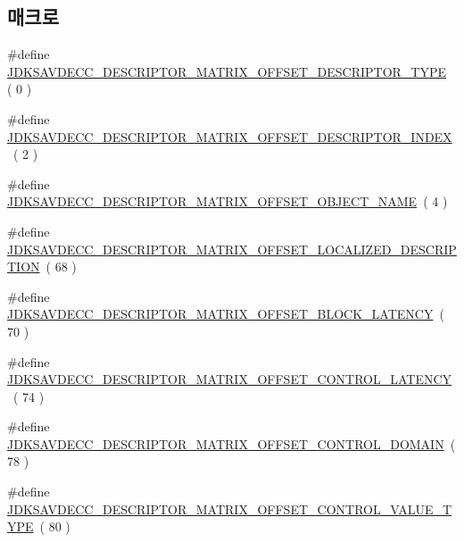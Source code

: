 \subsection*{매크로}
\begin{DoxyCompactItemize}
\item 
\#define \hyperlink{group__descriptor__matrix_gac508a3e60a3848d70e10eb9d85f8b153}{J\+D\+K\+S\+A\+V\+D\+E\+C\+C\+\_\+\+D\+E\+S\+C\+R\+I\+P\+T\+O\+R\+\_\+\+M\+A\+T\+R\+I\+X\+\_\+\+O\+F\+F\+S\+E\+T\+\_\+\+D\+E\+S\+C\+R\+I\+P\+T\+O\+R\+\_\+\+T\+Y\+PE}~( 0 )
\item 
\#define \hyperlink{group__descriptor__matrix_ga2a9d7345e6db186a6bce18c8feb19964}{J\+D\+K\+S\+A\+V\+D\+E\+C\+C\+\_\+\+D\+E\+S\+C\+R\+I\+P\+T\+O\+R\+\_\+\+M\+A\+T\+R\+I\+X\+\_\+\+O\+F\+F\+S\+E\+T\+\_\+\+D\+E\+S\+C\+R\+I\+P\+T\+O\+R\+\_\+\+I\+N\+D\+EX}~( 2 )
\item 
\#define \hyperlink{group__descriptor__matrix_ga47badb9357fe1c60839270d56246e7d7}{J\+D\+K\+S\+A\+V\+D\+E\+C\+C\+\_\+\+D\+E\+S\+C\+R\+I\+P\+T\+O\+R\+\_\+\+M\+A\+T\+R\+I\+X\+\_\+\+O\+F\+F\+S\+E\+T\+\_\+\+O\+B\+J\+E\+C\+T\+\_\+\+N\+A\+ME}~( 4 )
\item 
\#define \hyperlink{group__descriptor__matrix_gaee4e1928d01bbd0f5a2ea8aae8136d55}{J\+D\+K\+S\+A\+V\+D\+E\+C\+C\+\_\+\+D\+E\+S\+C\+R\+I\+P\+T\+O\+R\+\_\+\+M\+A\+T\+R\+I\+X\+\_\+\+O\+F\+F\+S\+E\+T\+\_\+\+L\+O\+C\+A\+L\+I\+Z\+E\+D\+\_\+\+D\+E\+S\+C\+R\+I\+P\+T\+I\+ON}~( 68 )
\item 
\#define \hyperlink{group__descriptor__matrix_gaf9f3c84e2827a0c14b447df99ef21905}{J\+D\+K\+S\+A\+V\+D\+E\+C\+C\+\_\+\+D\+E\+S\+C\+R\+I\+P\+T\+O\+R\+\_\+\+M\+A\+T\+R\+I\+X\+\_\+\+O\+F\+F\+S\+E\+T\+\_\+\+B\+L\+O\+C\+K\+\_\+\+L\+A\+T\+E\+N\+CY}~( 70 )
\item 
\#define \hyperlink{group__descriptor__matrix_ga3ece98d4d22befa425987b01a91cdbf9}{J\+D\+K\+S\+A\+V\+D\+E\+C\+C\+\_\+\+D\+E\+S\+C\+R\+I\+P\+T\+O\+R\+\_\+\+M\+A\+T\+R\+I\+X\+\_\+\+O\+F\+F\+S\+E\+T\+\_\+\+C\+O\+N\+T\+R\+O\+L\+\_\+\+L\+A\+T\+E\+N\+CY}~( 74 )
\item 
\#define \hyperlink{group__descriptor__matrix_ga4d1587501585e7a2df12de1e651b6dd3}{J\+D\+K\+S\+A\+V\+D\+E\+C\+C\+\_\+\+D\+E\+S\+C\+R\+I\+P\+T\+O\+R\+\_\+\+M\+A\+T\+R\+I\+X\+\_\+\+O\+F\+F\+S\+E\+T\+\_\+\+C\+O\+N\+T\+R\+O\+L\+\_\+\+D\+O\+M\+A\+IN}~( 78 )
\item 
\#define \hyperlink{group__descriptor__matrix_gab49e2b294086e236a2f3e36baf30379a}{J\+D\+K\+S\+A\+V\+D\+E\+C\+C\+\_\+\+D\+E\+S\+C\+R\+I\+P\+T\+O\+R\+\_\+\+M\+A\+T\+R\+I\+X\+\_\+\+O\+F\+F\+S\+E\+T\+\_\+\+C\+O\+N\+T\+R\+O\+L\+\_\+\+V\+A\+L\+U\+E\+\_\+\+T\+Y\+PE}~( 80 )

\end{DoxyCompactItemize}
